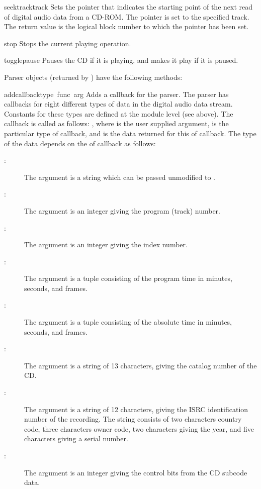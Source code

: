\begin{funcdesc}{seektrack}{track}
Sets the pointer that indicates the starting point of the next read of
digital audio data from a CD-ROM.  The pointer is set to the specified
track.  The return value is the logical block number to which the
pointer has been set.
\end{funcdesc}

\begin{funcdesc}{stop}{}
Stops the current playing operation.
\end{funcdesc}

\begin{funcdesc}{togglepause}{}
Pauses the CD if it is playing, and makes it play if it is paused.
\end{funcdesc}

Parser objects (returned by ) have the
following methods:


\begin{funcdesc}{addcallback}{type\, func\, arg}
Adds a callback for the parser.  The parser has callbacks for eight
different types of data in the digital audio data stream.  Constants
for these types are defined at the  module level (see above).
The callback is called as follows: , where
 is the user supplied argument,  is the
particular type of callback, and  is the data returned for
this  of callback.  The type of the data depends on the
 of callback as follows:
\begin{description}
\item[: ]
The argument is a string which can be passed unmodified to
.
\item[: ]
The argument is an integer giving the program (track) number.
\item[: ]
The argument is an integer giving the index number.
\item[: ]
The argument is a tuple consisting of the program time in minutes,
seconds, and frames.
\item[: ]
The argument is a tuple consisting of the absolute time in minutes,
seconds, and frames.
\item[: ]
The argument is a string of 13 characters, giving the catalog number
of the CD.
\item[: ]
The argument is a string of 12 characters, giving the ISRC
identification number of the recording.  The string consists of two
characters country code, three characters owner code, two characters
giving the year, and five characters giving a serial number.
\item[: ]
The argument is an integer giving the control bits from the CD subcode
data.
\end{description}
\end{funcdesc}

